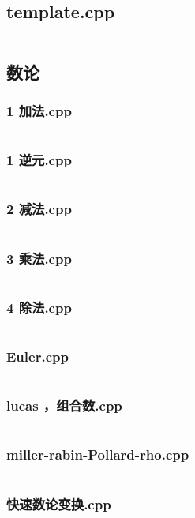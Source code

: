 \documentclass{article}
\begin{document}
\subsection{template.cpp}
\inputminted{c++}{/home/zzuzxy/t2/Template1.0/4 数学/Lagrange-poly/template.cpp}
\subsection{数论}
\subsubsection{1 加法.cpp}
\inputminted{c++}{/home/zzuzxy/t2/Template1.0/4 数学/数论/1 加法.cpp}
\subsubsection{1 逆元.cpp}
\inputminted{c++}{/home/zzuzxy/t2/Template1.0/4 数学/数论/1 逆元.cpp}
\subsubsection{2 减法.cpp}
\inputminted{c++}{/home/zzuzxy/t2/Template1.0/4 数学/数论/2 减法.cpp}
\subsubsection{3 乘法.cpp}
\inputminted{c++}{/home/zzuzxy/t2/Template1.0/4 数学/数论/3 乘法.cpp}
\subsubsection{4 除法.cpp}
\inputminted{c++}{/home/zzuzxy/t2/Template1.0/4 数学/数论/4 除法.cpp}
\subsubsection{Euler.cpp}
\inputminted{c++}{/home/zzuzxy/t2/Template1.0/4 数学/数论/Euler.cpp}
\subsubsection{lucas ，组合数.cpp}
\inputminted{c++}{/home/zzuzxy/t2/Template1.0/4 数学/数论/lucas ，组合数.cpp}
\subsubsection{miller-rabin-Pollard-rho.cpp}
\inputminted{c++}{/home/zzuzxy/t2/Template1.0/4 数学/数论/miller-rabin-Pollard-rho.cpp}
\subsubsection{快速数论变换.cpp}
\inputminted{c++}{/home/zzuzxy/t2/Template1.0/4 数学/数论/快速数论变换.cpp}
\end{document}
